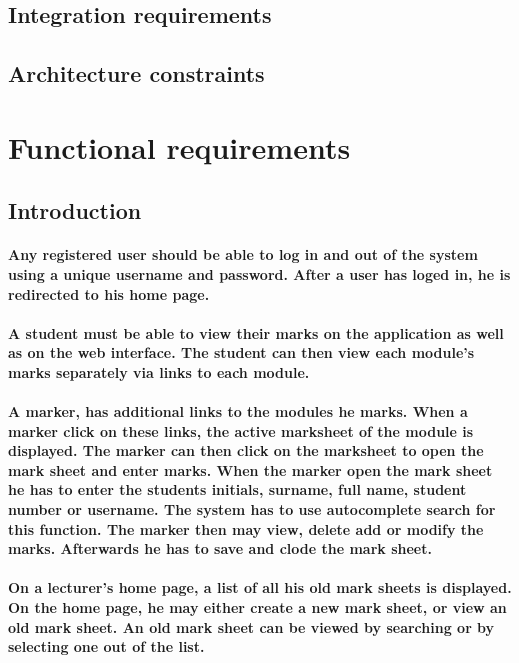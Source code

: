 \documentclass[12pt]{article}
\begin{document}
  \subsection{Integration requirements}
  \subsection{Architecture constraints}
  \section{Functional requirements}
  \subsection{Introduction}
  \paragraph*{Any registered user should be able to log in and out of the system using a unique username and password. After a user has loged in, he is redirected to his home page.}
  \paragraph*{A student must be able to view their marks on the application as well as on  the web interface. The student can then view each module's marks separately via links to each module. }
  \paragraph*{A marker, has additional links to the modules he marks. When a marker click on these links, the active marksheet of the module is displayed. The marker can then click on the marksheet to open the mark sheet and enter marks. When the marker open the mark sheet he has to enter the students initials, surname, full name, student number or username. The system has to use autocomplete search for this function. The marker then may view, delete add or modify the marks. Afterwards he has to save and clode the mark sheet.}
  \paragraph*{On a lecturer's home page, a list of all his old mark sheets is displayed. On the home page, he may either create a new mark sheet, or view an old mark sheet. An old mark sheet can be viewed by searching or by selecting one out of the list.}
\end{document}
